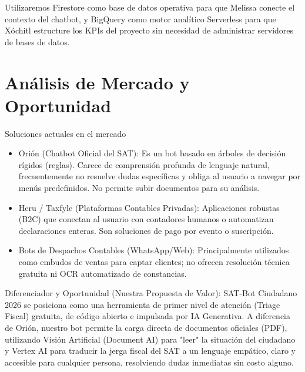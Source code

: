 \documentclass[10pt,a4paper]{article}
\begin{document}
\vspace{2mm}

Utilizaremos Firestore como base de datos operativa para que Melissa conecte el contexto del chatbot, y 
BigQuery como motor analítico Serverless para que Xóchitl estructure los KPIs del proyecto sin necesidad de administrar servidores de bases de datos.

\newpage

\section{Análisis de Mercado y Oportunidad}

\vspace{2mm}

Soluciones actuales en el mercado


\vspace{2mm}

\begin{itemize}
    \item Orión (Chatbot Oficial del SAT): Es un bot basado en árboles de decisión rígidos (reglas).
    Carece de comprensión profunda de lenguaje natural, frecuentemente no resuelve 
    dudas específicas y obliga al usuario a navegar por menús predefinidos. 
    No permite subir documentos para su análisis.
    \item Heru / Taxfyle (Plataformas Contables Privadas): 
    Aplicaciones robustas (B2C) que conectan al usuario con contadores humanos o 
    automatizan declaraciones enteras. Son soluciones de pago por evento o suscripción.
    \item Bots de Despachos Contables (WhatsApp/Web): 
    Principalmente utilizados como embudos de ventas para captar clientes; 
    no ofrecen resolución técnica gratuita ni OCR automatizado de constancias.
\end{itemize}


\vspace{2mm}

Diferenciador y Oportunidad (Nuestra Propuesta de Valor):
SAT-Bot Ciudadano 2026 se posiciona como una herramienta de primer nivel de atención 
(Triage Fiscal) gratuita, de código abierto e impulsada por IA Generativa. 
A diferencia de Orión, nuestro bot permite la carga directa de documentos oficiales (PDF),
 utilizando Visión Artificial (Document AI) para "leer" la situación del ciudadano y 
 Vertex AI para traducir la jerga fiscal del SAT a un lenguaje empático, claro y 
 accesible para cualquier persona, resolviendo dudas inmediatas sin costo alguno.
\end{document}
